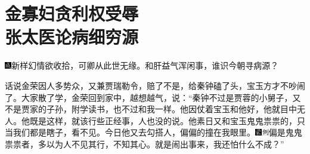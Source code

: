 

\chapter{金寡妇贪利权受辱\\张太医论病细穷源}\label{part0014_split_000.htmlux5cux23calibre_pb_0}

{\includegraphics[width=3mm]{../Images/00005}新样幻情欲收拾，可卿从此世无缘。和肝益气浑闲事，谁识今朝寻病源？}

话说金荣因人多势众，又兼贾瑞勒令，赔了不是，给秦钟磕了头，宝玉方才不吵闹了。大家散了学，金荣回到家中，越想越气，说：``秦钟不过是贾蓉的小舅子，又不是贾家的子孙，附学读书，也不过和我一样。他因仗着宝玉和他好，他就目中无人。他既是这样，就该行些正经事，人也没的说。他素日又和宝玉鬼鬼祟祟的，只当我们都是瞎子，看不见。今日他又去勾搭人，偏偏的撞在我眼里。{\includegraphics[width=3mm]{../Images/00006}\includegraphics[width=3mm]{../Images/00011}\footnotesize \kaishu 偏是鬼鬼祟祟者，多以为人不见其行，不知其心。}就是闹出事来，我还怕什么不成？''

